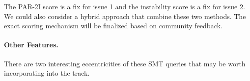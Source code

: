\documentclass[
]{ceurart}
\begin{document}


The PAR-2I score is a fix for issue 1 and the instability score is a fix for issue 2. We could also consider a hybrid approach that combine these two methods. The exact scoring mechanism will be finalized based on community feedback.

\paragraph{Other Features.} There are two interesting eccentricities of these
SMT queries that may be worth incorporating into the track.
\end{document}
